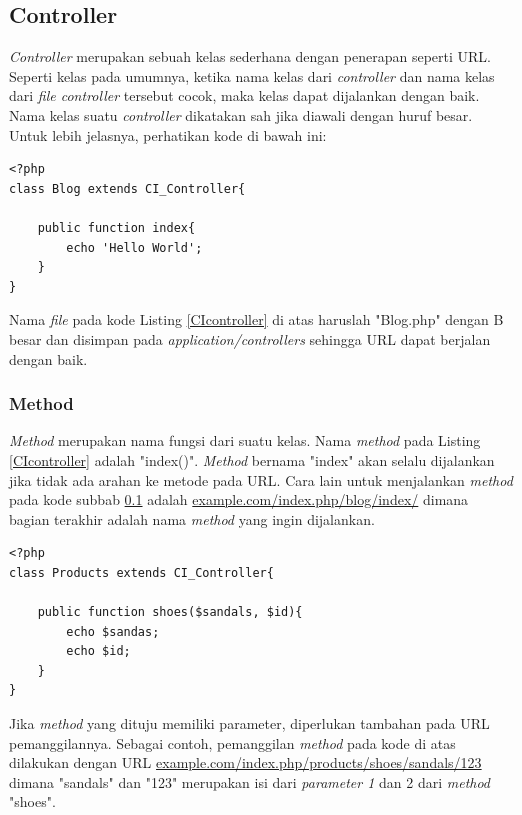 \subsection{Controller}
\label{sub: controller}

	\textit{Controller} merupakan sebuah kelas sederhana dengan penerapan seperti URL. Seperti kelas pada umumnya, ketika nama kelas dari \textit{controller} dan nama kelas dari \textit{file controller} tersebut cocok, maka kelas dapat dijalankan dengan baik. Nama kelas suatu \textit{controller} dikatakan sah jika diawali dengan huruf besar. Untuk lebih jelasnya, perhatikan kode di bawah ini:
\begin{lstlisting}[caption={CI Controller},label={CIcontroller}]
<?php
class Blog extends CI_Controller{
	
	public function index{
		echo 'Hello World';
	}
}
\end{lstlisting}

	Nama \textit{file} pada kode Listing \ref{CIcontroller} di atas haruslah  "Blog.php" dengan B besar dan disimpan pada \textit{application/controllers} sehingga URL dapat berjalan dengan baik.
	
\subsubsection{Method}
\label{subsub: method}

	\textit{Method} merupakan nama fungsi dari suatu kelas. Nama \textit{method} pada Listing \ref{CIcontroller} adalah "index()". \textit{Method} bernama "index" akan selalu dijalankan jika tidak ada arahan ke metode pada URL. Cara lain untuk menjalankan \textit{method} pada kode subbab \ref{sub: controller} adalah \url{example.com/index.php/blog/index/} dimana bagian terakhir adalah nama \textit{method} yang ingin dijalankan.
	
	
	\begin{lstlisting}[caption=CI Controller Method]
<?php
class Products extends CI_Controller{

	public function shoes($sandals, $id){
		echo $sandas;
		echo $id;
	}
}
	\end{lstlisting}
	
	Jika \textit{method} yang dituju memiliki parameter, diperlukan tambahan pada URL pemanggilannya. Sebagai contoh, pemanggilan \textit{method}	pada kode di atas dilakukan dengan URL \url{example.com/index.php/products/shoes/sandals/123} dimana "sandals" dan "123" merupakan isi dari \textit{parameter 1} dan 2 dari \textit{method} "shoes".
	

